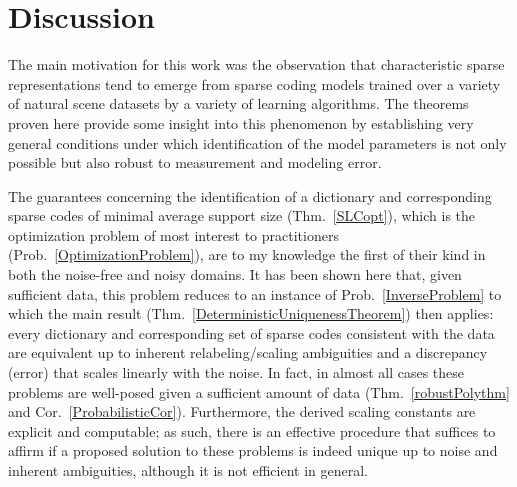 \chapter{Discussion}\label{Discussion}

The main motivation for this work was the observation that characteristic sparse representations tend to emerge from sparse coding models trained over a variety of natural scene datasets by a variety of learning algorithms. The theorems proven here provide some insight into this phenomenon by establishing very general conditions under which identification of the model parameters is not only possible but also robust to measurement and modeling error.

The guarantees concerning the identification of a dictionary and corresponding sparse codes of minimal average support size (Thm.~\ref{SLCopt}), which is the optimization problem of most interest to practitioners (Prob.~\ref{OptimizationProblem}), are to my knowledge the first of their kind in both the noise-free and noisy domains. It has been shown here that, given sufficient data, this problem reduces to an instance of Prob.~\ref{InverseProblem} to which the main result (Thm.~\ref{DeterministicUniquenessTheorem}) then applies: every dictionary and corresponding set of sparse codes consistent with the data are equivalent up to inherent relabeling/scaling ambiguities and a discrepancy (error) that scales linearly with the noise. 
In fact, %
in almost all cases these problems are well-posed given a sufficient amount of data (Thm.~\ref{robustPolythm} and Cor.~\ref{ProbabilisticCor}). 
Furthermore, the derived scaling constants are explicit and computable; as such, there is an effective procedure that suffices to affirm if a proposed solution to these problems is indeed unique up to noise and inherent ambiguities, although it is not efficient in general. %



